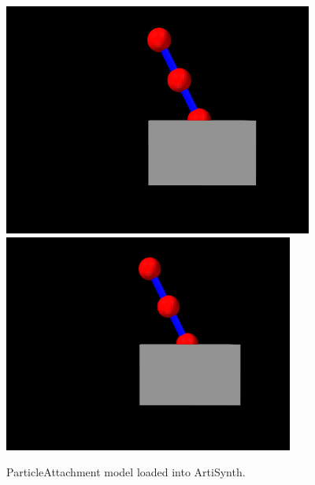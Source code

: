 \begin{figure}[ht]
\begin{center}
\iflatexml
 \includegraphics[]{images/ParticleAttachment}
\else
 \includegraphics[width=3.75in]{images/ParticleAttachment}
\fi
\end{center}
\caption{ParticleAttachment model loaded into ArtiSynth.}
\label{ParticleAttachment:fig}
\end{figure}

